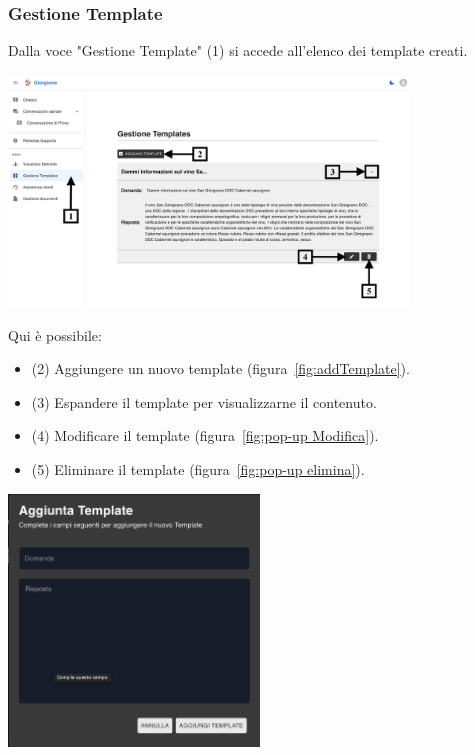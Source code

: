 \subsubsection{Gestione Template}
Dalla voce "Gestione Template" (1) si accede all’elenco dei template creati.
\begin{center}
    \includegraphics[width=0.8\textwidth]{./img/GestioneTemplate.png}
    \label{fig:Template}
\end{center}

Qui è possibile:
\begin{itemize}
    \item (2) Aggiungere un nuovo template (figura~\ref{fig:addTemplate}).
    \item (3) Espandere il template per visualizzarne il contenuto.
    \item (4) Modificare il template (figura~\ref{fig:pop-up Modifica}).
    \item (5) Eliminare il template (figura~\ref{fig:pop-up elimina}).
\end{itemize}

\begin{center}
    \includegraphics[width=0.5\textwidth]{./img/AggiungiTemplate.png}
    \label{fig:addTemplate}
\end{center}

